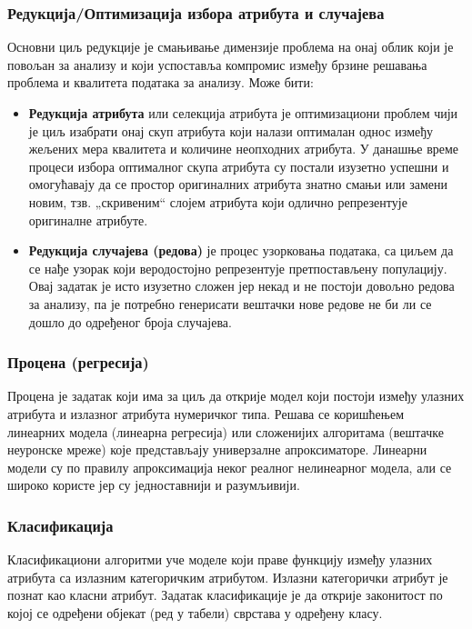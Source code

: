 \subsubsection{Редукција/Оптимизација избора атрибута и случајева}
Основни циљ редукције је смањивање димензије проблема на онај облик који је повољан за анализу и који успоставља компромис између брзине решавања проблема и квалитета података за анализу. Може бити:

\begin{itemize}
  \item \textbf{Редукција атрибута} или селекција атрибута је оптимизациони проблем чији је циљ изабрати онај скуп атрибута који налази оптималан однос између жељених мера квалитета и количине неопходних атрибута. У данашње време процеси избора оптималног скупа атрибута су постали изузетно успешни и омогућавају да се простор оригиналних атрибута знатно смањи или замени новим, тзв. „скривеним“ слојем атрибута који одлично репрезентује оригиналне атрибуте.
  \item \textbf{Редукција случајева (редова)} је процес узорковања података, са циљем да се нађе узорак који веродостојно репрезентује претпостављену популацију. Овај задатак је исто изузетно сложен јер некад и не постоји довољно редова за анализу, па је потребно генерисати вештачки нове редове не би ли се дошло до одређеног броја случајева.
\end{itemize}

\subsubsection{Процена (регресија)}
Процена је задатак који има за циљ да открије модел који постоји између улазних атрибута и излазног атрибута нумеричког типа. Решава се коришћењем линеарних модела (линеарна регресија) или сложенијих алгоритама (вештачке неуронске мреже) које представљају универзалне апроксиматоре. Линеарни модели су по правилу апроксимација неког реалног нелинеарног модела, али се широко користе јер су једноставнији и разумљивији.

\subsubsection{Класификација}
Класификациони алгоритми уче моделе који праве функцију између улазних атрибута са излазним категоричким атрибутом. Излазни категорички атрибут је познат као класни атрибут. Задатак класификације је да открије законитост по којој се одређени објекат (ред у табели) сврстава у одређену класу.

